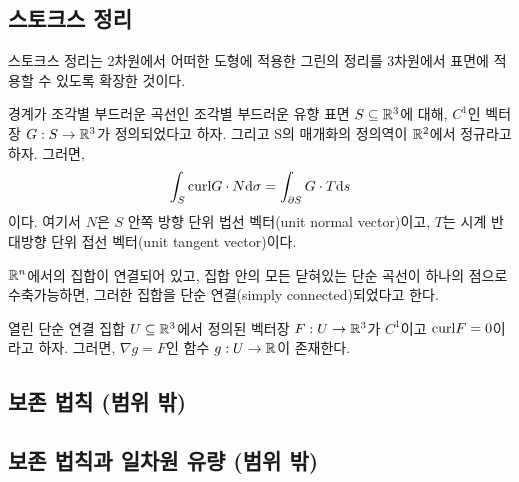 \subsection{스토크스 정리}
스토크스 정리는 2차원에서 어떠한 도형에 적용한 그린의 정리를 3차원에서 표면에 적용할 수 있도록 확장한 것이다.
\begin{theorem}
경계가 조각별 부드러운 곡선인 조각별 부드러운 유향 표면 $S\subseteq\mathbb{R}^3$에 대해, $C^1$인 벡터장 $G:S\to\mathbb{R}^3$가 정의되었다고 하자. 그리고 S의 매개화의 정의역이 $\mathbb{R}^2$에서 정규라고 하자. 그러면,
$$
\int_{S} \mathrm{curl} G\cdot N\dd \sigma = \int_{\partial S}G\cdot T\dd s
$$
이다. 여기서 $N$은 $S$ 안쪽 방향 단위 법선 벡터(unit normal vector)이고, $T$는 시계 반대방향 단위 접선 벡터(unit tangent vector)이다.
\end{theorem}
\begin{definition}[단순 연결]
$\mathbb{R}^n$에서의 집합이 연결되어 있고, 집합 안의 모든 닫혀있는 단순 곡선이 하나의 점으로 수축가능하면, 그러한 집합을 단순 연결(simply connected)되었다고 한다.
\end{definition}

\begin{theorem}
열린 단순 연결 집합 $U\subseteq\mathbb{R}^3$에서 정의된 벡터장 $F:U\to\mathbb{R}^3$가 $C^1$이고  $\mathrm{curl} F=0$이라고 하자. 그러면, $\nabla g=F$인 함수 $g:U\to\mathbb{R}$이 존재한다.
\end{theorem}

\subsection{보존 법칙 (범위 밖)}

\subsection{보존 법칙과 일차원 유량 (범위 밖)}
